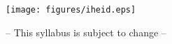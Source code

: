 \documentclass[11pt,a4paper]{article}
\begin{document}
	

\hspace*{-1.25cm}
\texttt{[image: figures/iheid.eps]}
\vspace{0.25cm}

	\centering
	-- This syllabus is subject to change --
	
\end{document}
